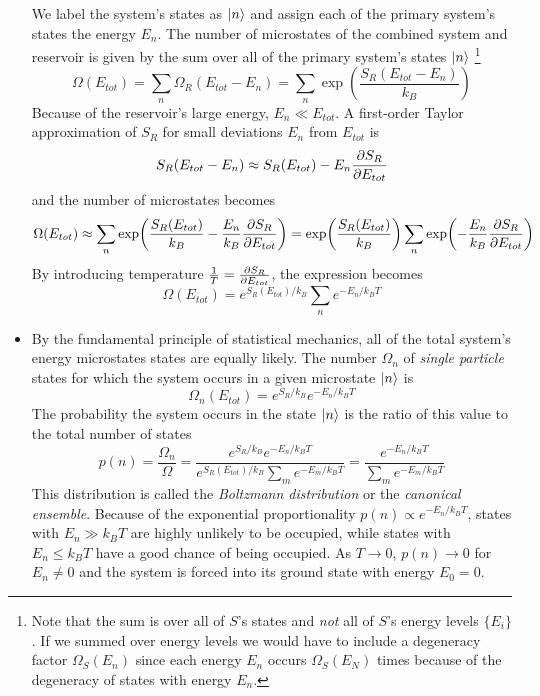 \documentclass[11pt, a4paper]{article}
\begin{document}
\begin{itemize}
	We label the system's states as $ \ket{n} $ and assign each of the primary system's states the energy $ E_{n} $. The number of microstates of the combined system and reservoir is given by the sum over all of the primary system's states $ \ket{n} $ \footnote{Note that the sum is over all of $ S $'s states and \textit{not} all of $ S $'s energy levels $ \{E_{i}\} $. If we summed over energy levels we would have to include a degeneracy factor $ \Omega_{S}(E_{n}) $ since each energy $ E_{n} $ occurs $ \Omega_{S}(E_{N}) $ times because of the degeneracy of states with energy $ E_{n} $.}
	\begin{equation*}
		\Omega(E_{tot}) = \sum_{n}\Omega_{R}(E_{tot} - E_{n}) = \sum_{n} \exp(\frac{S_{R}(E_{tot}- E_{n})}{k_{B}})
	\end{equation*}
	Because of the reservoir's large energy, $ E_{n} \ll E_{tot}$. A first-order Taylor approximation of $ S_{R} $ for small deviations $ E_{n} $ from $ E_{tot} $ is
	\begin{equation*}
		S_{R}(E_{tot} - E_{n}) \approx S_{R}(E_{tot}) - E_{n}\pdv{S_{R}}{E_{tot}}
	\end{equation*}
	and the number of microstates becomes
	\begin{equation*}
		\Omega(E_{tot}) \approx \sum_{n} \exp(\frac{S_{R}(E_{tot}) }{k_{B}} - \frac{E_{n}}{k_{B}}\pdv{S_{R}}{E_{tot}}) = \exp(\frac{S_{R}(E_{tot})}{k_{B}}) \sum_{n} \exp(- \frac{E_{n}}{k_{B}}\pdv{S_{R}}{E_{tot}})
	\end{equation*}
	By introducing temperature $ \frac{1}{T} = \pdv{S_{R}}{E_{tot}} $, the expression becomes
	\begin{equation*}
		\Omega(E_{tot}) = e^{S_{R}(E_{tot})/k_{B}} \sum_{n} e^{-E_{n}/k_{B}T}
	\end{equation*}
		
	\item By the fundamental principle of statistical mechanics, all of the total system's energy microstates states are equally likely. The number $ \Omega_{n} $ of \textit{single particle} states for which the system occurs in a given microstate $ \ket{n} $ is
	\begin{equation*}
		\Omega_{n}(E_{tot}) = e^{S_{R}/k_{B}} e^{-E_{n}/k_{B}T}
	\end{equation*}
	The probability the system occurs in the state $ \ket{n} $ is the ratio of this value to the total number of states
	\begin{equation*}
		p(n) = \frac{\Omega_{n}}{\Omega} = \frac{e^{S_{R}/k_{B}} e^{-E_{n}/k_{B}T}}{e^{S_{R}(E_{tot})/k_{B}} \sum_{m} e^{-E_{m}/k_{B}T}} = \frac{ e^{-E_{n}/k_{B}T}}{\sum_{m} e^{-E_{m}/k_{B}T}}
	\end{equation*}
	This distribution is called the \textit{Boltzmann distribution} or the \textit{canonical ensemble}. Because of the exponential proportionality $ p(n) \propto  e^{-E_{n}/k_{B}T} $, states with $ E_{n} \gg k_{B}T $ are highly unlikely to be occupied, while states with $ E_{n} \leq k_{B}T $ have a good chance of being occupied. As $ T \to 0 $, $ p(n) \to 0 $ for $ E_{n} \neq 0 $ and the system is forced into its ground state with energy $ E_{0} = 0$.
	

\end{itemize}
\end{document}
